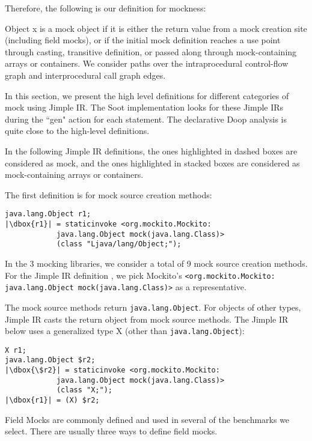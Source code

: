 Therefore, the following is our definition for mockness:

Object x is a mock object if it is either the return value from a mock creation site (including field mocks), or if the initial mock definition reaches a use point through casting, transitive definition, or passed along through mock-containing arrays or containers. We consider paths over the intraprocedural control-flow graph and interprocedural call graph edges.


In this section, we present the high level definitions for different categories of mock using Jimple IR. The Soot implementation looks for these Jimple IRs during the ``gen" action for each statement. The declarative Doop analysis is quite close to the high-level definitions.

In the following Jimple IR definitions, the ones highlighted in dashed boxes are considered as mock, and the ones highlighted in stacked boxes are considered as mock-containing arrays or containers.

The first definition is for mock source creation methods: 

\begin{lstlisting}[basicstyle=\linespread{1.0}\ttfamily\small,numbers=none,escapechar={|}]
java.lang.Object r1;
|\dbox{r1}| = staticinvoke <org.mockito.Mockito:
			java.lang.Object mock(java.lang.Class)>
			(class "Ljava/lang/Object;");

\end{lstlisting}

In the 3 mocking libraries, we consider a total of 9 mock source creation methods. For the Jimple IR definition , we pick Mockito's \texttt{<org.mockito.Mockito: java.lang.Object mock(java.lang.Class)>} as a representative.

The mock source methods return \texttt{java.lang.Object}. For objects of other types, Jimple IR casts the return object from mock source methods. The Jimple IR below uses a generalized type X (other than \texttt{java.lang.Object}):

\begin{lstlisting}[basicstyle=\linespread{1.0}\ttfamily\small,numbers=none,escapechar={|}]
X r1;
java.lang.Object $r2;
|\dbox{\$r2}| = staticinvoke <org.mockito.Mockito: 
			java.lang.Object mock(java.lang.Class)>
			(class "X;");
|\dbox{r1}| = (X) $r2;
\end{lstlisting}

Field Mocks are commonly defined and used in several of the benchmarks we select. There are usually three ways to define field mocks. 

